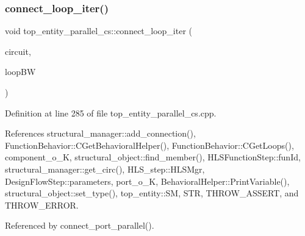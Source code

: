 \subsubsection{\texorpdfstring{connect\+\_\+loop\+\_\+iter()}{connect\_loop\_iter()}}
{\footnotesize\ttfamily void top\+\_\+entity\+\_\+parallel\+\_\+cs\+::connect\+\_\+loop\+\_\+iter (\begin{DoxyParamCaption}\item[{const \hyperlink{structural__objects_8hpp_a8ea5f8cc50ab8f4c31e2751074ff60b2}{structural\+\_\+object\+Ref}}]{circuit,  }\item[{unsigned}]{loop\+BW }\end{DoxyParamCaption})\hspace{0.3cm}{\ttfamily [protected]}}



Definition at line 285 of file top\+\_\+entity\+\_\+parallel\+\_\+cs.\+cpp.



References structural\+\_\+manager\+::add\+\_\+connection(), Function\+Behavior\+::\+C\+Get\+Behavioral\+Helper(), Function\+Behavior\+::\+C\+Get\+Loops(), component\+\_\+o\+\_\+K, structural\+\_\+object\+::find\+\_\+member(), H\+L\+S\+Function\+Step\+::fun\+Id, structural\+\_\+manager\+::get\+\_\+circ(), H\+L\+S\+\_\+step\+::\+H\+L\+S\+Mgr, Design\+Flow\+Step\+::parameters, port\+\_\+o\+\_\+K, Behavioral\+Helper\+::\+Print\+Variable(), structural\+\_\+object\+::set\+\_\+type(), top\+\_\+entity\+::\+SM, S\+TR, T\+H\+R\+O\+W\+\_\+\+A\+S\+S\+E\+RT, and T\+H\+R\+O\+W\+\_\+\+E\+R\+R\+OR.



Referenced by connect\+\_\+port\+\_\+parallel().

